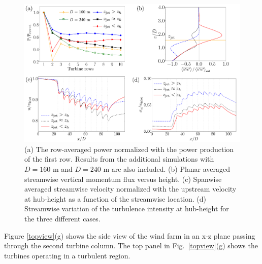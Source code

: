 \documentclass[%
 aip,
 amsmath,amssymb,
reprint,
twocolumn,%
author-numerical,%
]{revtex4-1}
\begin{document}
\begin{figure}[ht!]
	\centering
	\includegraphics[width=0.9\linewidth]{fig5} 
	\caption{(a) The row-averaged power normalized with the power production of the first row. Results from the additional simulations with $D=160$ m and $D=240$ m are also included. (b) Planar averaged streamwise vertical momentum flux versus height. (c) Spanwise averaged streamwise velocity normalized with the upstream velocity at hub-height as a function of the streamwise location. (d) Streamwise variation of the turbulence intensity at hub-height for the three different cases.}
	\label{powerplots}
\end{figure}
\indent Figure \ref{topview}(g) shows the side view of the wind farm in an x-z plane passing through the second turbine column. The top panel in Fig.\ \ref{topview}(g) shows the turbines operating in a turbulent region. 
\end{document}
